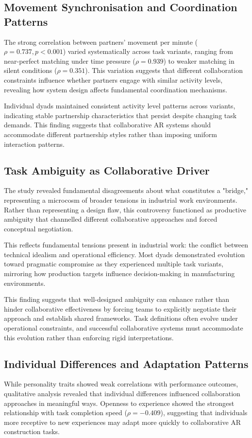 \subsection{Movement Synchronisation and Coordination Patterns}
The strong correlation between partners' movement per minute ($\rho = 0.737, p < 0.001$) varied systematically across task variants, ranging from near-perfect matching under time pressure ($\rho = 0.939$) to weaker matching in silent conditions ($\rho = 0.351$). This variation suggests that different collaboration constraints influence whether partners engage with similar activity levels, revealing how system design affects fundamental coordination mechanisms.

Individual dyads maintained consistent activity level patterns across variants, indicating stable partnership characteristics that persist despite changing task demands. This finding suggests that collaborative AR systems should accommodate different partnership styles rather than imposing uniform interaction patterns.

\subsection{Task Ambiguity as Collaborative Driver}
The study revealed fundamental disagreements about what constitutes a "bridge," representing a microcosm of broader tensions in industrial work environments. Rather than representing a design flaw, this controversy functioned as productive ambiguity that channelled different collaborative approaches and forced conceptual negotiation.

This reflects fundamental tensions present in industrial work: the conflict between technical idealism and operational efficiency. Most dyads demonstrated evolution toward pragmatic compromise as they experienced multiple task variants, mirroring how production targets influence decision-making in manufacturing environments.

This finding suggests that well-designed ambiguity can enhance rather than hinder collaborative effectiveness by forcing teams to explicitly negotiate their approach and establish shared frameworks. Task definitions often evolve under operational constraints, and successful collaborative systems must accommodate this evolution rather than enforcing rigid interpretations.

\subsection{Individual Differences and Adaptation Patterns}
While personality traits showed weak correlations with performance outcomes, qualitative analysis revealed that individual differences influenced collaboration approaches in meaningful ways. Openness to experience showed the strongest relationship with task completion speed ($\rho = -0.409$), suggesting that individuals more receptive to new experiences may adapt more quickly to collaborative AR construction tasks.

